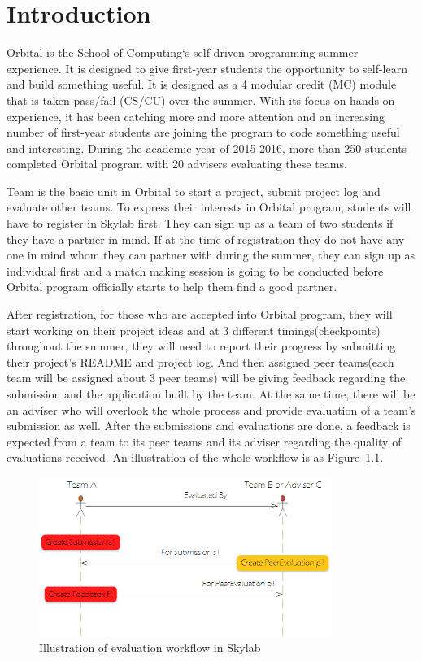 \chapter{Introduction} \label{introduction}

Orbital is the School of Computing`s self-driven programming summer experience. It is designed to give first-year students the opportunity to self-learn and build something useful. It is designed as a 4 modular credit (MC) module that is taken pass/fail (CS/CU) over the summer\cite{citation0}. With its focus on hands-on experience, it has been catching more and more attention and an increasing number of first-year students are joining the program to code something useful and interesting. During the academic year of 2015-2016, more than 250 students completed Orbital program with 20 advisers evaluating these teams.

Team is the basic unit in Orbital to start a project, submit project log and evaluate other teams. To express their interests in Orbital program, students will have to register in Skylab first. They can sign up as a team of two students if they have a partner in mind. If at the time of registration they do not have any one in mind whom they can partner with during the summer, they can sign up as individual first and a match making session is going to be conducted before Orbital program officially starts to help them find a good partner.

After registration, for those who are accepted into Orbital program, they will start working on their project ideas and at 3 different timings(checkpoints) throughout the summer, they will need to report their progress by submitting their project's README and project log. And then assigned peer teams(each team will be assigned about 3 peer teams) will be giving feedback regarding the submission and the application built by the team. At the same time, there will be an adviser who will overlook the whole process and provide evaluation of a team's submission as well. After the submissions and evaluations are done, a feedback is expected from a team to its peer teams and its adviser regarding the quality of evaluations received. An illustration of the whole workflow is as Figure~\ref{fig:EvaluationWorkflow}.

\begin{figure}[h]
  \centering
  \includegraphics[width=0.85\textwidth]{Images/Skylab_Evaluation_Workflow.png}
  \caption{Illustration of evaluation workflow in Skylab}
  \label{fig:EvaluationWorkflow}
\end{figure}

